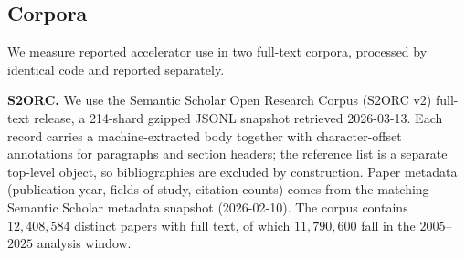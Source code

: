 %
%
%
%

\subsection{Corpora}

We measure reported accelerator use in two full-text corpora, processed by
identical code and reported separately.

\textbf{S2ORC.} We use the Semantic Scholar Open Research Corpus (S2ORC v2)
full-text release, a 214-shard gzipped JSONL snapshot retrieved 2026-03-13.
Each record carries a machine-extracted body together with character-offset
annotations for paragraphs and section headers; the reference list is a
separate top-level object, so bibliographies are excluded by construction. Paper
metadata (publication year, fields of study, citation counts) comes from the
matching Semantic Scholar metadata snapshot (2026-02-10). The corpus contains
$12{,}408{,}584$ distinct papers with full text, of which $11{,}790{,}600$
fall in the $2005$--$2025$ analysis window.


